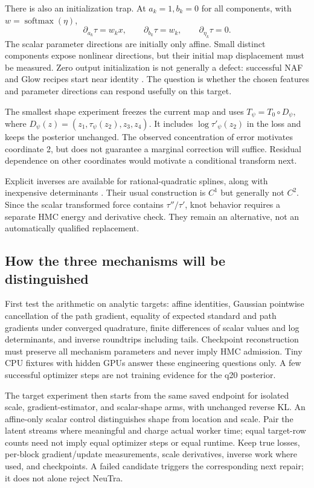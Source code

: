 There is also an initialization trap. At $a_k=1,b_k=0$ for all components,
with $w=\operatorname{softmax}(\eta)$,
\begin{equation}
 \partial_{a_k}\tau=w_kx,\qquad
 \partial_{b_k}\tau=w_k,\qquad
 \partial_{\eta_k}\tau=0.
\end{equation}
The scalar parameter directions are initially only affine. Small distinct
components expose nonlinear directions, but their initial map displacement
must be measured. Zero output initialization is not generally a defect:
successful NAF and Glow recipes start near identity
\citep[Appendix E]{huang2018naf}\citep[Section 3.3]{kingma2018glow}.
The question is whether the chosen features and parameter directions can
respond usefully on this target.

The smallest shape experiment freezes the current map and uses
$T_\psi=T_0\circ D_\psi$, where
$D_\psi(z)=(z_1,\tau_\psi(z_2),z_3,z_4)$. It includes
$\log\tau'_\psi(z_2)$ in the loss and keeps the posterior unchanged.
The observed concentration of error motivates coordinate 2, but does not
guarantee a marginal correction will suffice. Residual dependence on other
coordinates would motivate a conditional transform next.

Explicit inverses are available for rational-quadratic splines, along with
inexpensive determinants \citep[Section 3]{durkan2019splines}. Their usual construction is
$C^1$ but generally not $C^2$. Since the scalar transformed force contains
$\tau''/\tau'$, knot behavior requires a separate HMC energy and derivative
check. They remain an alternative, not an automatically qualified replacement.

\subsection{How the three mechanisms will be distinguished}

First test the arithmetic on analytic targets: affine identities, Gaussian
pointwise cancellation of the path gradient, equality of expected standard and
path gradients under converged quadrature, finite differences of scalar values
and log determinants, and inverse roundtrips including tails. Checkpoint
reconstruction must preserve all mechanism parameters and never imply HMC
admission. Tiny CPU fixtures with hidden GPUs answer these engineering
questions only. A few successful optimizer steps are not training evidence
for the q20 posterior.

The target experiment then starts from the same saved endpoint for isolated
scale, gradient-estimator, and scalar-shape arms, with unchanged reverse KL.
An affine-only scalar control distinguishes shape from location and scale.
Pair the latent streams where meaningful and charge actual worker time; equal
target-row counts need not imply equal optimizer steps or equal runtime.
Keep true losses, per-block gradient/update measurements, scale derivatives,
inverse work where used, and checkpoints. A failed candidate triggers the
corresponding next repair; it does not alone reject NeuTra.

